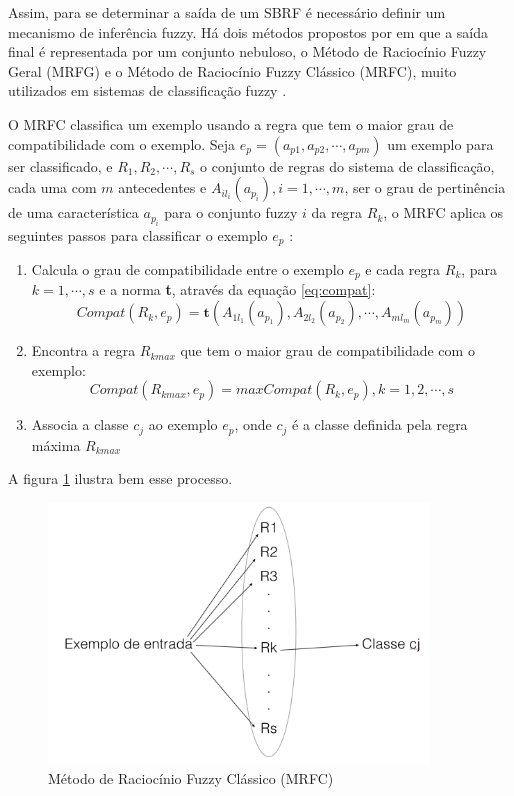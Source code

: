 \documentclass[template.tex]{subfiles}
\begin{document}
Assim, para se determinar a saída de um SBRF é necessário definir um mecanismo de inferência fuzzy. Há dois métodos propostos por  em que a saída final é representada por um conjunto nebuloso, o Método de Raciocínio Fuzzy Geral (MRFG) e o Método de Raciocínio Fuzzy Clássico (MRFC), muito utilizados em sistemas de classificação fuzzy \cite{cintra2008fuzzy}.

O MRFC classifica um exemplo usando a regra que tem o maior grau de compatibilidade com o exemplo. Seja $e_p = (a_{p1}, a_{p2}, \cdots, a_{pm})$ um exemplo para ser classificado, e {$R_1,R_2, \cdots, R_s$} o conjunto de regras do sistema de classificação, cada uma com $m$ antecedentes e $A_{il_i}(a_{p_i}), i = 1, \cdots, m$, ser o grau de pertinência de uma característica $a_{p_i}$ para o conjunto fuzzy $i$ da regra $R_k$, o MRFC aplica os seguintes passos para classificar o exemplo $e_p$ \cite{cintra2012genetic}:

\begin{enumerate}
\item Calcula o grau de compatibilidade entre o exemplo $e_p$ e cada regra $R_k$, para $k = 1, \cdots, s$ e a norma \textbf{t}, através da equação \ref{eq:compat}:
\begin{equation}
Compat(R_k, e_p) = \textbf{t}(A_{1l_1}(a_{p_1}), A_{2l_2}(a_{p_2}), \cdots, A_{ml_m}(a_{p_m}))
\label{eq:compat}
\end{equation}
\item Encontra a regra $R_{kmax}$ que tem o maior grau de compatibilidade com o exemplo:
\begin{equation}
Compat(R_{kmax}, e_p) = max{Compat(R_k, e_p)}, k = 1,2, \cdots, s
\end{equation}
\item Associa a classe $c_j$ ao exemplo $e_p$, onde $c_j$ é a classe definida pela regra máxima $R_{kmax}$
\end{enumerate}

A figura \ref{fig:mrfc} ilustra bem esse processo.

\begin{figure}[H]  
  \caption{Método de Raciocínio Fuzzy Clássico (MRFC)}
  \label{fig:mrfc}
  \centering
    \includegraphics[width=0.9\textwidth]{mrfc}
\end{figure}
\end{document}
